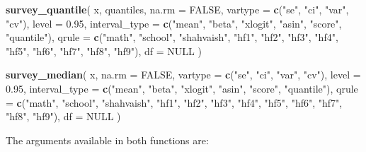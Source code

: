 \documentclass[
]{krantz}
\makeatletter
\newenvironment{Shaded}{\begin{snugshade}}{\end{snugshade}}
\newcommand{\AttributeTok}[1]{\textcolor[rgb]{0.27,0.27,0.27}{#1}}
\newcommand{\ConstantTok}[1]{\textcolor[rgb]{0.37,0.37,0.37}{#1}}
\newcommand{\FloatTok}[1]{\textcolor[rgb]{0.06,0.06,0.06}{#1}}
\newcommand{\FunctionTok}[1]{\textcolor[rgb]{0.27,0.27,0.27}{\textbf{#1}}}
\newcommand{\NormalTok}[1]{#1}
\newcommand{\StringTok}[1]{\textcolor[rgb]{0.5,0.5,0.5}{#1}}
\newenvironment{kframe}{%
\medskip{}
\setlength{\fboxsep}{.8em}
 \def\at@end@of@kframe{}%
 \ifinner\ifhmode%
  \def\at@end@of@kframe{\end{minipage}}%
  \begin{minipage}{\columnwidth}%
 \fi\fi%
 \def\FrameCommand##1{\hskip\@totalleftmargin \hskip-\fboxsep
 \colorbox{shadecolor}{##1}\hskip-\fboxsep
     \hskip-\linewidth \hskip-\@totalleftmargin \hskip\columnwidth}%
 \MakeFramed {\advance\hsize-\width
   \@totalleftmargin\z@ \linewidth\hsize
   \@setminipage}}%
 {\par\unskip\endMakeFramed%
 \at@end@of@kframe}
\renewenvironment{Shaded}{\begin{kframe}}{\end{kframe}}
\makeatother
\begin{document}
\begin{Shaded}
\begin{Highlighting}[]
\FunctionTok{survey\_quantile}\NormalTok{(}
\NormalTok{  x,}
\NormalTok{  quantiles,}
  \AttributeTok{na.rm =} \ConstantTok{FALSE}\NormalTok{,}
  \AttributeTok{vartype =} \FunctionTok{c}\NormalTok{(}\StringTok{"se"}\NormalTok{, }\StringTok{"ci"}\NormalTok{, }\StringTok{"var"}\NormalTok{, }\StringTok{"cv"}\NormalTok{),}
  \AttributeTok{level =} \FloatTok{0.95}\NormalTok{,}
  \AttributeTok{interval\_type =} \FunctionTok{c}\NormalTok{(}\StringTok{"mean"}\NormalTok{, }\StringTok{"beta"}\NormalTok{, }\StringTok{"xlogit"}\NormalTok{, }\StringTok{"asin"}\NormalTok{, }\StringTok{"score"}\NormalTok{, }\StringTok{"quantile"}\NormalTok{),}
  \AttributeTok{qrule =} \FunctionTok{c}\NormalTok{(}\StringTok{"math"}\NormalTok{, }\StringTok{"school"}\NormalTok{, }\StringTok{"shahvaish"}\NormalTok{, }\StringTok{"hf1"}\NormalTok{, }\StringTok{"hf2"}\NormalTok{, }\StringTok{"hf3"}\NormalTok{, }
            \StringTok{"hf4"}\NormalTok{, }\StringTok{"hf5"}\NormalTok{, }\StringTok{"hf6"}\NormalTok{, }\StringTok{"hf7"}\NormalTok{, }\StringTok{"hf8"}\NormalTok{, }\StringTok{"hf9"}\NormalTok{),}
  \AttributeTok{df =} \ConstantTok{NULL}
\NormalTok{)}

\FunctionTok{survey\_median}\NormalTok{(}
\NormalTok{  x,}
  \AttributeTok{na.rm =} \ConstantTok{FALSE}\NormalTok{,}
  \AttributeTok{vartype =} \FunctionTok{c}\NormalTok{(}\StringTok{"se"}\NormalTok{, }\StringTok{"ci"}\NormalTok{, }\StringTok{"var"}\NormalTok{, }\StringTok{"cv"}\NormalTok{),}
  \AttributeTok{level =} \FloatTok{0.95}\NormalTok{,}
  \AttributeTok{interval\_type =} \FunctionTok{c}\NormalTok{(}\StringTok{"mean"}\NormalTok{, }\StringTok{"beta"}\NormalTok{, }\StringTok{"xlogit"}\NormalTok{, }\StringTok{"asin"}\NormalTok{, }\StringTok{"score"}\NormalTok{, }\StringTok{"quantile"}\NormalTok{),}
  \AttributeTok{qrule =} \FunctionTok{c}\NormalTok{(}\StringTok{"math"}\NormalTok{, }\StringTok{"school"}\NormalTok{, }\StringTok{"shahvaish"}\NormalTok{, }\StringTok{"hf1"}\NormalTok{, }\StringTok{"hf2"}\NormalTok{, }\StringTok{"hf3"}\NormalTok{, }
            \StringTok{"hf4"}\NormalTok{, }\StringTok{"hf5"}\NormalTok{, }\StringTok{"hf6"}\NormalTok{, }\StringTok{"hf7"}\NormalTok{, }\StringTok{"hf8"}\NormalTok{, }\StringTok{"hf9"}\NormalTok{),}
  \AttributeTok{df =} \ConstantTok{NULL}
\NormalTok{)}
\end{Highlighting}
\end{Shaded}

The arguments available in both functions are:
\end{document}
